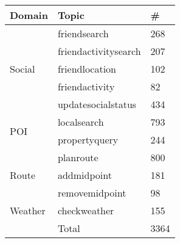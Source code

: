 \begin{tabular}{l|l|l}
Domain&Topic&\#\\\hline
\multirow{5}{*}{Social}&friendsearch&268\\
&friendactivitysearch&207\\
&friendlocation&102\\
&friendactivity&82\\
&updatesocialstatus&434\\\hline
\multirow{2}{*}{POI}&localsearch&793\\
&propertyquery&244\\\hline
\multirow{3}{*}{Route}&planroute&800\\
&addmidpoint&181\\
&removemidpoint&98\\\hline
Weather&checkweather&155\\\hline
&Total&3364\\
\end{tabular}
